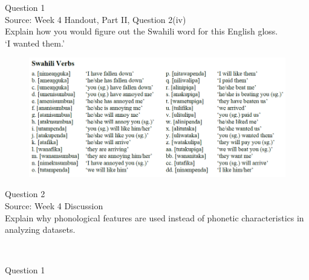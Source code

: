 \documentclass[12pt]{article}
\begin{document}
{\large Question 1}\\

Source: Week 4 Handout, Part II, Question 2(iv)\\

Explain how you would figure out the Swahili word for this English gloss.\\

‘I wanted them.’

\begin{figure}[H]
\includegraphics{../images/swahiliverbs.png}
\end{figure}

\newpage

{\large Question 2}\\

Source: Week 4 Discussion\\

Explain why phonological features are used instead of phonetic characteristics in analyzing datasets.\\


\newpage

\begin{center}
\textbf{{\color{red}{\HUGE END OF EXAM}}}\\

\end{center}
\newpage

\begin{center}
\textbf{{\color{blue}{\HUGE START OF EXAM\\}}}

\textbf{{\color{blue}{\HUGE Student ID: 23000\\}}}

\textbf{{\color{blue}{\HUGE 9:20\\}}}

\end{center}
\newpage

{\large Question 1}\\
\end{document}
